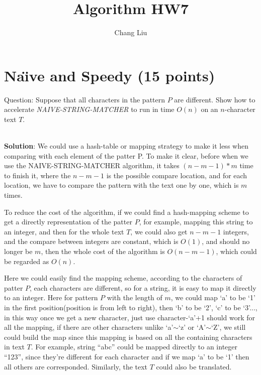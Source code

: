 \documentclass{article}
\author{Chang Liu}
\title{Algorithm HW7}
\begin{document}

\pagestyle{main}

\section{Na\"{\i}ve and Speedy (15 points)}
Question: Suppose that all characters in the pattern $P$ are different. Show how to accelerate \emph{NAIVE-STRING-MATCHER} to run in time $O(n)$ on an $n$-character text $T$.

~\\
\textbf{Solution}:\newline
\indent We could use a hash-table or mapping strategy to make it less when comparing with each element of the patter P. To make it clear, before when we use the NAIVE-STRING-MATCHER algorithm, it takes $(n-m-1)*m$ time to finish it, where the $n-m-1$ is the possible compare location, and for each location, we have to compare the pattern with the text one by one, which is $m$ times.

To reduce the cost of the algorithm, if we could find a hash-mapping scheme to get a directly representation of the patter $P$, for example, mapping this string to an integer, and then for the whole text $T$, we could also get $n-m-1$ integers, and the compare between integers are constant, which is $O(1)$, and should no longer be $m$, then the whole cost of the algorithm is $O(n-m-1)$, which could be regarded as $O(n)$.

Here we could easily find the mapping scheme, according to the characters of patter $P$, each characters are different, so for a string, it is easy to map it directly to an integer. Here for pattern $P$ with the length of $m$, we could map `a' to be `1' in the first position(position is from left to right), then `b' to be `2', `c' to be `3'..., in this way once we get a new character, just use character-`a'+1 should work for all the mapping, if there are other characters unlike `a'$\sim$`z' or `A'$\sim$`Z', we still could build the map since this mapping is based on all the containing characters in text $T$. For example, string ``abc'' could be mapped directly to an integer ``123'', since they're different for each character and if we map `a' to be `1' then all others are corresponded. Similarly, the text $T$ could also be translated.
\end{document}
